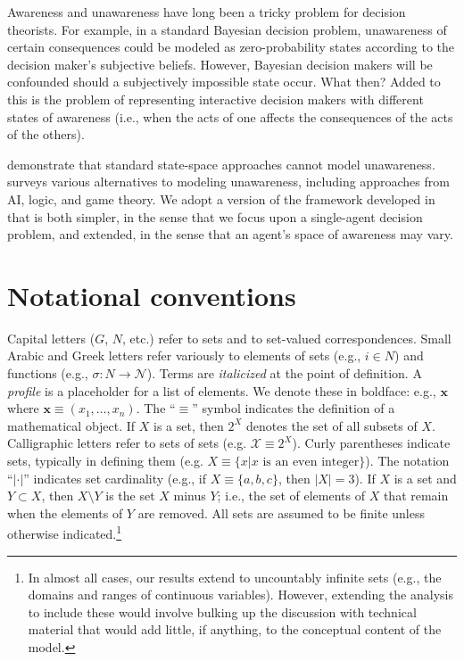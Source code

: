\documentclass[
11pt,
titlepage,
reqno,
]{article}%
\theoremstyle{definition}
\begin{document}
	Awareness and unawareness have long been a tricky problem for decision theorists. 
	For example, in a standard Bayesian decision problem, unawareness of certain consequences could be modeled as zero-probability states according to the decision maker's subjective beliefs. 
	However, Bayesian decision makers will be confounded should a subjectively impossible state occur. 
	What then?
	Added to this is the problem of representing interactive decision makers with different states of awareness (i.e., when the acts of one affects the consequences of the acts of the others). 
	
	\citet{Dekel1998} demonstrate that standard state-space approaches cannot model unawareness. 
	\citet{Schipper2015} surveys various alternatives to modeling unawareness, including approaches from  AI, logic, and game theory. 
	We adopt a version of the framework developed in \citet{Heifetz2006} \citep[also see][for related extensions]{Heifetz2008,Heifetz2013} that is both simpler, in the sense that we focus upon a single-agent decision problem, and extended, in the sense that an agent's space of awareness may vary.
	
	
\section{Notational conventions}

Capital letters ($G$, $N$, etc.) refer to sets and to set-valued correspondences.  
Small Arabic and Greek letters refer variously to elements of sets (e.g., $i\in N$) and functions (e.g., $\sigma:N\rightarrow \mathcal{N}$). 
Terms  are \textit{italicized} at the point of definition.  
A \textit{profile} is a placeholder for a list of elements.
We denote these in boldface: e.g., $\mathbf{x}$ where $\mathbf{x}\equiv(x_1,\ldots,x_n)$. 
The ``$\equiv$'' symbol indicates the definition of a mathematical object. 
If $X$ is a set, then $2^X$ denotes the set of all subsets of $X$. Calligraphic letters refer to sets of sets (e.g. $\mathcal{X}\equiv 2^X$). 
Curly parentheses indicate sets, typically in defining them (e.g. $X\equiv\{x|x\text{ is an even integer}\}$). 
The notation ``$|\cdot|$'' indicates set cardinality (e.g., if $X\equiv\{a,b,c\}$, then $|X|=3$). 
If $X$ is a set and $Y\subset X$, then $X\setminus Y$ is the set $X$ minus $Y$; i.e., the set of elements of $X$ that  remain when the elements of $Y$ are removed. 
All sets are assumed to be finite unless otherwise indicated.\footnote
{
	In almost all cases, our results extend to uncountably infinite sets (e.g., the domains and ranges of continuous variables). However, extending the analysis to include these would involve bulking up the discussion with technical material that would add little, if anything, to the conceptual content of the model.
}
	
\end{document}
